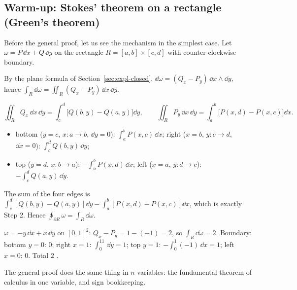 \subsection{Warm-up: Stokes' theorem on a rectangle (Green's theorem)}\label{sec:green}

Before the general proof, let us see the mechanism in the simplest case. Let $\omega=P\,\dd x+Q\,\dd y$ on the rectangle $R=[a,b]\times[c,d]$ with counter-clockwise boundary.

 By the plane formula of Section~\ref{sec:expl-closed}, $\dd\omega=(Q_x-P_y)\,\dd x\wedge\dd y$, hence $\int_R\dd\omega=\iint_R(Q_x-P_y)\,\dd x\,\dd y$.

\[
\iint_RQ_x\,\dd x\,\dd y=\int_c^d\bigl[Q(b,y)-Q(a,y)\bigr]\dd y,\qquad
\iint_RP_y\,\dd x\,\dd y=\int_a^b\bigl[P(x,d)-P(x,c)\bigr]\dd x .
\]

\begin{itemize}
\item bottom ($y=c$, $x:a\to b$, $\dd y=0$): $\int_a^bP(x,c)\,\dd x$; right ($x=b$, $y:c\to d$, $\dd x=0$): $\int_c^dQ(b,y)\,\dd y$;
\item top ($y=d$, $x:b\to a$): $-\int_a^bP(x,d)\,\dd x$; left ($x=a$, $y:d\to c$): $-\int_c^dQ(a,y)\,\dd y$.
\end{itemize}

 The sum of the four edges is $\int_c^d[Q(b,y)-Q(a,y)]\dd y-\int_a^b[P(x,d)-P(x,c)]\dd x$, which is exactly Step 2. Hence $\oint_{\partial R}\omega=\int_R\dd\omega$.

\numcheck $\omega=-y\,\dd x+x\,\dd y$ on $[0,1]^2$: $Q_x-P_y=1-(-1)=2$, so $\int_R\dd\omega=2$. Boundary: bottom $y=0$: $0$; right $x=1$: $\int_0^11\,\dd y=1$; top $y=1$: $-\int_0^1(-1)\,\dd x=1$; left $x=0$: $0$. Total $2$ \checkmark.

The general proof does the same thing in $n$ variables: the fundamental theorem of calculus in one variable, and sign bookkeeping.
